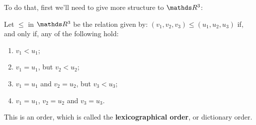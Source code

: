 \bigskip
To do that, first we'll need to give more structure to $\R^3$:

\begin{df}
	Let $\leq$ in $\R^3$ be the relation given by: $(v_1,v_2,v_3)\leq (u_1,u_2,u_3)$ if, and only if, any of the following hold:
	\begin{enumerate}[(1)]		
		\item $v_1< u_1$;
		\item $v_1=u_1$, but $v_2< u_2$;
		\item $v_1=u_1$ and $v_2=u_2$, but $v_3< u_3$;
		\item $v_1=u_1$, $v_2=u_2$ and $v_3=u_3$.
	\end{enumerate}

	This is an order, which is called the \textbf{lexicographical order}, or dictionary order.
\end{df}

